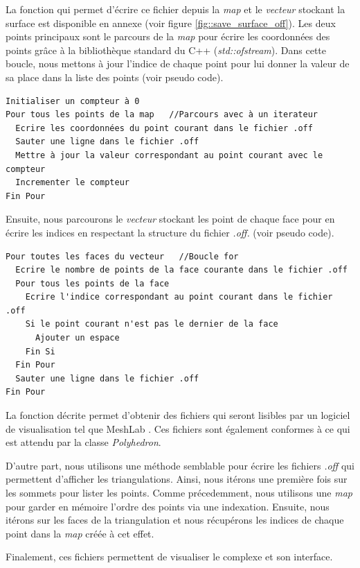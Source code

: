 La fonction qui permet d'écrire ce fichier depuis la \textit{map} et le \textit{vecteur}
stockant la surface est disponible en annexe (voir figure \ref{fig::save_surface_off}).
Les deux points principaux sont le parcours de la \textit{map} pour écrire les coordonnées
des points grâce à la bibliothèque standard du C++ (\textit{std::ofstream}).
Dans cette boucle, nous mettons à jour l'indice
de chaque point pour lui donner la valeur de sa place dans la liste des points (voir
pseudo code).


\begin{lstlisting}
Initialiser un compteur à 0
Pour tous les points de la map   //Parcours avec à un iterateur
  Ecrire les coordonnées du point courant dans le fichier .off
  Sauter une ligne dans le fichier .off
  Mettre à jour la valeur correspondant au point courant avec le compteur
  Incrementer le compteur
Fin Pour
\end{lstlisting}


Ensuite, nous parcourons le \textit{vecteur} stockant les point de chaque face pour en écrire
les indices en respectant la structure du fichier \textit{.off.} (voir pseudo code).

\begin{lstlisting}
Pour toutes les faces du vecteur   //Boucle for
  Ecrire le nombre de points de la face courante dans le fichier .off
  Pour tous les points de la face
    Ecrire l'indice correspondant au point courant dans le fichier .off
    Si le point courant n'est pas le dernier de la face
      Ajouter un espace
    Fin Si
  Fin Pour
  Sauter une ligne dans le fichier .off
Fin Pour
\end{lstlisting}

La fonction décrite permet d'obtenir des fichiers qui seront lisibles par un logiciel de
visualisation tel que MeshLab \cite{mes}. Ces fichiers sont également conformes à ce qui est
attendu par la classe \textit{Polyhedron}.

D'autre part, nous utilisons une méthode semblable pour écrire les fichiers \textit{.off}
qui permettent d'afficher les triangulations. Ainsi, nous itérons une première fois
sur les sommets pour lister les points. Comme précedemment, nous utilisons une \textit{map}
pour garder en mémoire l'ordre des points via une indexation. Ensuite, nous itérons sur
les faces de la triangulation et nous récupérons les indices de chaque point dans la
\textit{map} créée à cet effet.


Finalement, ces fichiers permettent de visualiser le complexe et son interface.
